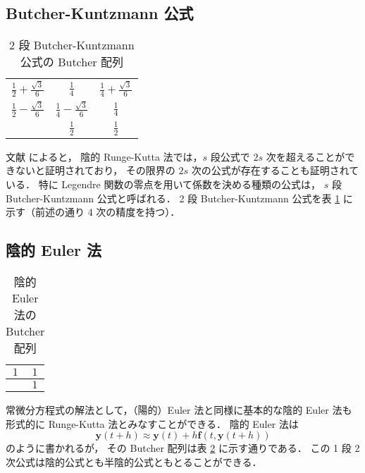 \subsection{Butcher-Kuntzmann 公式}

\begin{table}[bp]
    \caption{2 段 Butcher-Kuntzmann 公式の Butcher 配列}
    \label{table:ode_runge-kutta_butcher-array-2stage-butcher-kuntzmann}
    \centering
    \begin{tabular}{c|cc}
        $\frac{1}{2} + \frac{\sqrt{3}}{6}$ & $\frac{1}{4}$                      & $\frac{1}{4} + \frac{\sqrt{3}}{6}$ \\
        $\frac{1}{2} - \frac{\sqrt{3}}{6}$ & $\frac{1}{4} - \frac{\sqrt{3}}{6}$ & $\frac{1}{4}$                      \\
        \hline
                                           & $\frac{1}{2}$                      & $\frac{1}{2}$
    \end{tabular}
\end{table}

文献 \cite[5.2 節 (b)]{Mitsui1993} によると，
陰的 Runge-Kutta 法では，$s$ 段公式で $2s$ 次を超えることができないと証明されており，
その限界の $2s$ 次の公式が存在することも証明されている．
特に Legendre 関数の零点を用いて係数を決める種類の公式は，
$s$ 段 Butcher-Kuntzmann 公式と呼ばれる．
2 段 Butcher-Kuntzmann 公式を表
\ref{table:ode_runge-kutta_butcher-array-2stage-butcher-kuntzmann}
に示す（前述の通り 4 次の精度を持つ）．

\subsection{陰的 Euler 法}

\begin{table}[bp]
    \caption{陰的 Euler 法の Butcher 配列}
    \label{table:ode_runge-kutta_butcher-array-implicit-euler}
    \centering
    \begin{tabular}{c|c}
        $1$ & $1$ \\
        \hline
            & $1$
    \end{tabular}
\end{table}

常微分方程式の解法として，（陽的）Euler 法と同様に基本的な陰的 Euler 法も
形式的に Runge-Kutta 法とみなすことができる．
陰的 Euler 法は
\begin{equation}
    \bm{y}(t + h) \approx \bm{y}(t) + h \bm{f}(t, \bm{y}(t + h))
\end{equation}
のように書かれるが，
その Butcher 配列は表 \ref{table:ode_runge-kutta_butcher-array-implicit-euler} に示す通りである．
この 1 段 2 次公式は陰的公式とも半陰的公式ともとることができる．

